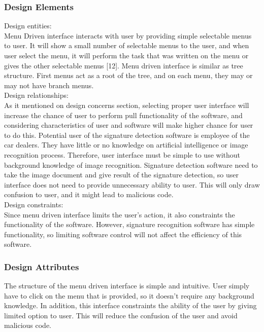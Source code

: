 \documentclass[onecolumn, draftclsnofoot,10pt, compsoc]{IEEEtran}
\begin{document}
\subsubsection{Design Elements}
Design entities: \\
Menu Driven interface interacts with user by providing simple selectable menus to user. It will show a small number of selectable menus to the user, and when user select the menu, it will perform the task that was written on the menu or gives the other selectable menus [12]. Menu driven interface is similar as tree structure. First menus act as a root of the tree, and on each menu, they may or may not have branch menus.\\

Design relationships:\\
As it mentioned on design concerns section, selecting proper user interface will increase the chance of user to perform pull functionality of the software, and considering characteristics of user and software will make higher chance for user to do this. Potential user of the signature detection software is employee of the car dealers. They have little or no knowledge on artificial intelligence or image recognition process. Therefore, user interface must be simple to use without background knowledge of image recognition. Signature detection software need to take the image document and give result of the signature detection, so user interface does not need to provide unnecessary ability to user. This will only draw confusion to user, and it might lead to malicious code.\\

Design constraints:\\
Since menu driven interface limits the user’s action, it also constraints the functionality of the software. However, signature recognition software has simple functionality, so limiting software control will not affect the efficiency of this software.\\

\subsubsection{Design Attributes}
The structure of the menu driven interface is simple and intuitive. User simply have to click on the menu that is provided, so it doesn’t require any background knowledge. In addition, this interface constraints the ability of the user by giving limited option to user. This will reduce the confusion of the user and avoid malicious code.
\end{document}

